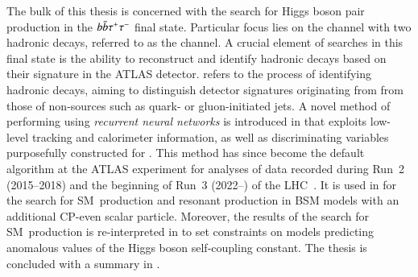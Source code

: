 The bulk of this thesis is concerned with the search for Higgs boson pair
production in the $b\bar{b}\tau^{+} \tau^{-}$ final state. Particular focus lies on the
channel with two hadronic \taulepton decays, referred to as the \hadhad channel.
A crucial element of searches in this final state is the ability to reconstruct
and identify hadronic \taulepton decays based on their signature in the ATLAS
detector. \emph{\Tauid} refers to the process of identifying hadronic \taulepton
decays, aiming to distinguish detector signatures originating from \tauhad from
those of non-\tauhad sources such as quark- or gluon-initiated jets. A novel
method of performing \tauid using \emph{recurrent neural networks} is introduced
in  that exploits low-level tracking and calorimeter
information, as well as discriminating variables purposefully constructed for
\tauid. This method has since become the default \tauid algorithm at the ATLAS
experiment for analyses of data recorded during Run~2 (2015--2018) and the
beginning of Run~3 (2022--) of the
LHC~\cite{ATL-PHYS-PUB-2019-033,ATL-PHYS-PUB-2022-044}. It is used in
 for the search for SM~\HH production and resonant \HH
production in BSM models with an additional CP-even scalar particle. Moreover,
the results of the search for SM~\HH production is re-interpreted in
 to set constraints on models predicting anomalous
values of the Higgs boson self-coupling constant. The thesis is
concluded with a summary in .


